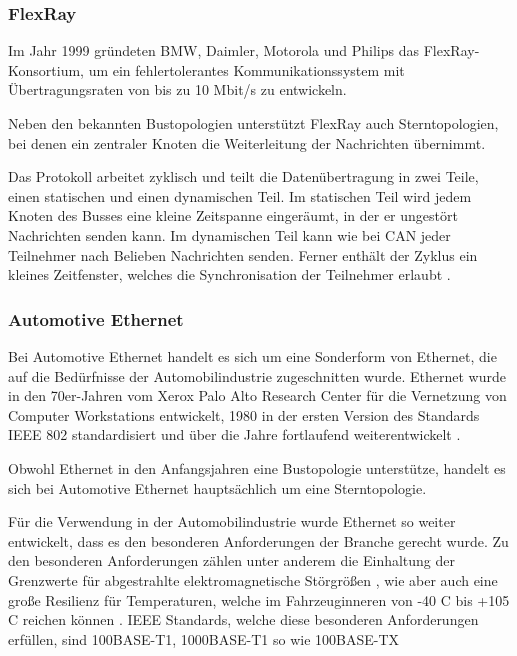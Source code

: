 \subsubsection{FlexRay}\label{subsec:Flex}

Im Jahr 1999 gründeten BMW, Daimler, Motorola und Philips das FlexRay-Konsortium, um ein fehlertolerantes Kommunikationssystem mit Übertragungsraten von bis zu 10 Mbit/s zu entwickeln.

Neben den bekannten Bustopologien unterstützt FlexRay auch Sterntopologien, bei denen ein zentraler Knoten die Weiterleitung der Nachrichten übernimmt. 

Das Protokoll arbeitet zyklisch und teilt die Datenübertragung in zwei Teile, einen statischen und einen dynamischen Teil. Im statischen Teil wird jedem Knoten des Busses eine kleine Zeitspanne eingeräumt, in der er ungestört Nachrichten senden kann. Im dynamischen Teil kann wie bei CAN jeder Teilnehmer nach Belieben Nachrichten senden. Ferner enthält der Zyklus ein kleines Zeitfenster, welches die Synchronisation der Teilnehmer erlaubt \cite[S. 96]{bussyteme}.

\subsubsection{Automotive Ethernet}\label{subsec:ethernet}

Bei Automotive Ethernet handelt es sich um eine Sonderform von Ethernet, die auf die Bedürfnisse der Automobilindustrie zugeschnitten wurde. Ethernet wurde in den 70er-Jahren vom Xerox Palo Alto Research Center  für die Vernetzung von Computer Workstations entwickelt, 1980 in der ersten Version des Standards IEEE 802 standardisiert und über die Jahre fortlaufend weiterentwickelt \cite[S. xxxii]{automotiveethernet}.

Obwohl Ethernet in den Anfangsjahren eine Bustopologie unterstütze, handelt es sich bei Automotive Ethernet hauptsächlich um eine Sterntopologie.

Für die Verwendung in der Automobilindustrie wurde Ethernet so weiter entwickelt, dass es den besonderen Anforderungen der Branche gerecht wurde. Zu den besonderen Anforderungen zählen unter anderem die Einhaltung der Grenzwerte für abgestrahlte elektromagnetische Störgrößen \cite[S. 109]{automotiveethernet}, wie aber auch eine große Resilienz für Temperaturen, welche im Fahrzeuginneren von -40 \textdegree{}C bis +105 \textdegree{}C reichen können \cite[S. 320]{automotiveethernet}. IEEE Standards, welche diese besonderen Anforderungen erfüllen, sind 100BASE-T1, 1000BASE-T1 so wie 100BASE-TX \cite[S. 217]{automotiveethernet}

